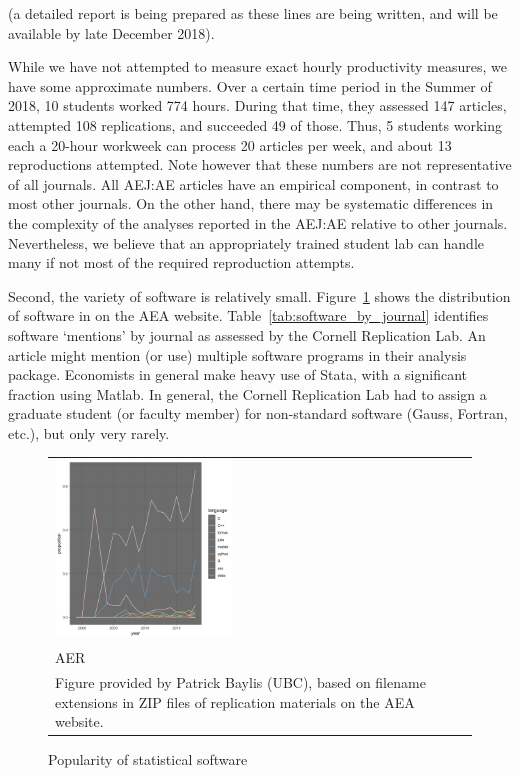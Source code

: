 \documentclass[AEJ]{AEA}
\begin{document}
(a detailed report is being prepared as these lines are being written, and will be available by late December 2018). 

While we have not attempted to measure exact hourly productivity measures, we have some approximate numbers. Over a certain time period in the Summer of 2018, 10 students worked 774 hours. During that time, they assessed 147 articles, attempted 108 replications, and succeeded 49 of those. Thus, 5 students working each a 20-hour workweek can process 20 articles per week, and about 13 reproductions attempted. Note however that these numbers are not representative of all journals. All AEJ:AE articles have an empirical component, in contrast to most other journals. On the other hand, there may be systematic differences in the complexity of the analyses reported in the AEJ:AE relative to other journals. Nevertheless, we believe that an appropriately trained student lab can handle many if not most of the required reproduction attempts.

Second, the variety of software is relatively small. Figure~\ref{fig:aer_programs_by_year} shows the distribution of software in  on the AEA website. Table~\ref{tab:software_by_journal} identifies software `mentions' by journal as assessed by the Cornell Replication Lab. An article might mention (or use) multiple software programs in their analysis package.  Economists in general make heavy use of Stata, with a significant fraction using Matlab. In general, the Cornell Replication Lab had to assign a graduate student (or faculty member) for non-standard software (Gauss, Fortran, etc.), but only very rarely.

\begin{figure}
    \centering
    \begin{tabular}{p{}r}
\includegraphics[width=0.45\textwidth]{images/aer_programs_by_year.png}
   
  &
    
   \\
 AER & %
 \\
      \footnotesize Figure provided by Patrick Baylis (UBC), based on filename extensions in ZIP files of replication materials on the AEA website.\\
\end{tabular}
\caption{Popularity of statistical software\label{fig:aer_programs_by_year}}
\end{figure}
\end{document}

